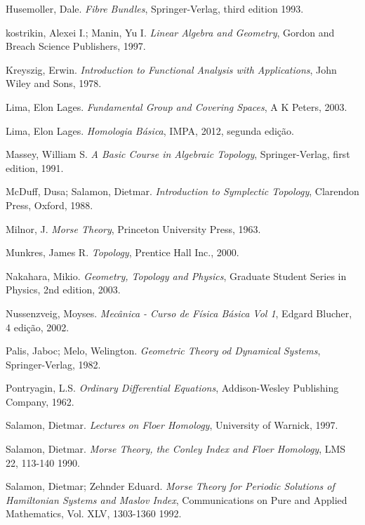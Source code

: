 \documentclass[12pt]{book}
\begin{document}
\begin{thebibliography}{9}
		Husemoller, Dale.
		\emph{Fibre Bundles},
		Springer-Verlag, third edition
		1993.
		
		kostrikin, Alexei I.; Manin, Yu I.
		\emph{Linear Algebra and Geometry},
		Gordon and Breach Science Publishers, 1997.
		
		
		Kreyszig, Erwin.
		\emph{Introduction to Functional Analysis with Applications},
		John Wiley and Sons, 1978.
		
		
		Lima, Elon Lages.
		\emph{Fundamental Group and Covering Spaces},
		A K Peters, 2003.

		Lima, Elon Lages.
		\emph{Homologia Básica},
		IMPA, 2012, segunda edição.
		
		Massey, William S.
		\emph{A Basic Course in Algebraic Topology},
		Springer-Verlag, first edition,
		1991.
	
		McDuff, Dusa; Salamon, Dietmar.
		\emph{Introduction to Symplectic Topology},
		Clarendon Press, Oxford, 1988.
	
		Milnor, J.
		\emph{Morse Theory},
		Princeton University Press, 1963.

		Munkres, James R.
		\emph{Topology},
		Prentice Hall Inc., 2000.
				
		Nakahara, Mikio.
		\emph{Geometry, Topology and Physics},
		Graduate Student Series in Physics, 2nd edition,
		2003.
		
		Nussenzveig, Moyses.
		\emph{Mecânica - Curso de Física Básica Vol 1},
		Edgard Blucher, 4 edição,
		2002.
		
		Palis, Jaboc; Melo, Welington.
		\emph{Geometric Theory od Dynamical Systems},
		Springer-Verlag,
		1982.
		
		Pontryagin, L.S.
		\emph{Ordinary Differential Equations},
		Addison-Wesley Publishing Company,
		1962.
		
		Salamon, Dietmar.
		\emph{Lectures on Floer Homology},
		University of Warnick,
		1997.


		Salamon, Dietmar.
		\emph{Morse Theory, the Conley Index and Floer Homology},
		LMS 22, 113-140
		1990.

		Salamon, Dietmar; Zehnder Eduard.
		\emph{Morse Theory for Periodic Solutions of Hamiltonian Systems and Maslov Index},
		Communications on Pure and Applied Mathematics, Vol. XLV, 1303-1360
		1992.
		

\end{thebibliography}
\end{document}
